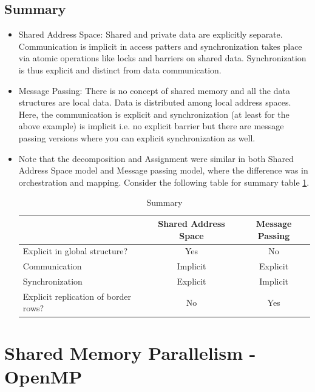 \documentclass[12pt]{article}
\begin{document}
\subsection{Summary}
\begin{itemize}
\item Shared Address Space: Shared and private data are explicitly separate. Communication is implicit in access patters and synchronization takes place via atomic operations like locks and barriers on shared data.
Synchronization is thus explicit and distinct from data communication.
\item Message Passing: There is no concept of shared memory and all the data structures are local data. Data is distributed among local address spaces. 
Here, the communication is explicit and synchronization (at least for the above example) is implicit i.e. no explicit barrier but there are message passing versions where you can explicit synchronization as well.
\item Note that the decomposition and Assignment were similar in both Shared Address Space model and Message passing model, where the difference was in orchestration and mapping. Consider the following table for summary table \ref{tab:finsummary}.
\begin{table}[H]
    \centering
    \begin{tabular}{|p{}|c|c|}
        \hline
        & Shared Address Space & Message Passing \\
        \hline
        Explicit in global structure? & Yes & No\\
        Communication & Implicit & Explicit \\
        Synchronization & Explicit & Implicit \\
        Explicit replication of border rows? & No & Yes \\
        \hline
    \end{tabular}
    \caption{Summary}
    \label{tab:finsummary}
\end{table}
\end{itemize}

\section{Shared Memory Parallelism - OpenMP}
\end{document}
